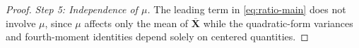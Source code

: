 \documentclass[12pt]{article}
\theoremstyle{remark}
\theoremstyle{plain}
\begin{document}
\begin{proof}
	\textit{Step 5: Independence of $\mu$.}  
	The leading term in \eqref{eq:ratio-main} does not involve $\mu$, since $\mu$ affects only the mean of $\bar{\mathbf{X}}$ while the quadratic-form variances and fourth-moment identities depend solely on centered quantities.
	
\end{proof}





	

	


\end{document}
